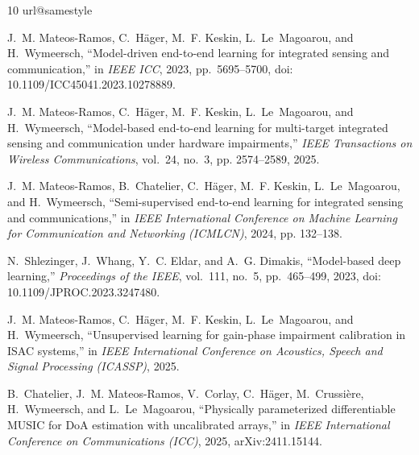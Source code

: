 \documentclass[conference]{IEEEtran}
\begin{document}
\begin{thebibliography}{10}
\providecommand{\url}[1]{#1}
\csname url@samestyle\endcsname
\providecommand{\newblock}{\relax}
\providecommand{\bibinfo}[2]{#2}
\providecommand{\BIBentrySTDinterwordspacing}{\spaceskip=0pt\relax}
\providecommand{\BIBentryALTinterwordstretchfactor}{4}
\providecommand{\BIBentryALTinterwordspacing}{\spaceskip=\fontdimen2\font plus
\BIBentryALTinterwordstretchfactor\fontdimen3\font minus
  \fontdimen4\font\relax}
\providecommand{\BIBforeignlanguage}[2]{{%
\expandafter\ifx\csname l@#1\endcsname\relax
\typeout{** WARNING: IEEEtran.bst: No hyphenation pattern has been}%
\typeout{** loaded for the language `#1'. Using the pattern for}%
\typeout{** the default language instead.}%
\else
\language=\csname l@#1\endcsname
\fi
#2}}
\providecommand{\BIBdecl}{\relax}
\BIBdecl

J.~M. Mateos-Ramos, C.~H\"ager, M.~F. Keskin, L.~Le~Magoarou, and H.~Wymeersch,
\textquotedblleft Model-driven end-to-end learning for integrated sensing and communication,\textquotedblright{}
in \emph{IEEE ICC}, 2023, pp.~5695--5700, doi: 10.1109/ICC45041.2023.10278889.

J.~M. Mateos-Ramos, C.~H{\"a}ger, M.~F. Keskin, L.~Le~Magoarou, and
  H.~Wymeersch, ``Model-based end-to-end learning for multi-target integrated
  sensing and communication under hardware impairments,'' \emph{IEEE
  Transactions on Wireless Communications}, vol.~24, no.~3, pp. 2574--2589,
  2025.

J.~M. Mateos-Ramos, B.~Chatelier, C.~H{\"a}ger, M.~F. Keskin, L.~Le~Magoarou,
  and H.~Wymeersch, ``Semi-supervised end-to-end learning for integrated
  sensing and communications,'' in \emph{IEEE International Conference on
  Machine Learning for Communication and Networking (ICMLCN)}, 2024, pp.
  132--138.

N.~Shlezinger, J.~Whang, Y.~C. Eldar, and A.~G. Dimakis, \textquotedblleft Model-based deep learning,\textquotedblright{} \emph{Proceedings of the IEEE}, vol.~111, no.~5, pp.~465--499, 2023, doi: 10.1109/JPROC.2023.3247480.

J.~M. Mateos-Ramos, C.~H{\"a}ger, M.~F. Keskin, L.~Le~Magoarou, and H.~Wymeersch, ``Unsupervised learning for gain-phase impairment calibration in {ISAC}
  systems,'' in \emph{IEEE International Conference on Acoustics, Speech and
  Signal Processing (ICASSP)}, 2025.

B.~Chatelier, J.~M. Mateos-Ramos, V.~Corlay, C.~H{\"a}ger, M.~Crussi{\`e}re,
  H.~Wymeersch, and L.~Le~Magoarou, ``Physically parameterized differentiable
  {MUSIC} for {DoA} estimation with uncalibrated arrays,'' in \emph{IEEE
  International Conference on Communications (ICC)}, 2025, arXiv:2411.15144.


\end{thebibliography}
\end{document}
